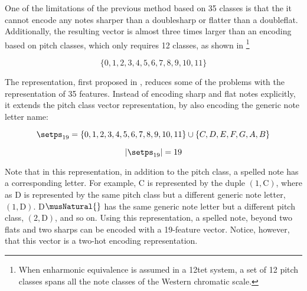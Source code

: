 
One of the limitations of the previous method based on 35
classes is that the it cannot encode any notes sharper than
a \gls{doublesharp} or flatter than a \gls{doubleflat}.
Additionally, the resulting vector is almost three times
larger than an encoding based on pitch classes, which only
requires 12 classes, as shown in
\footnote{When enharmonic equivalence
is assumed in a \gls{12tet} system, a set of 12 pitch
classes spans all the note classes of the Western chromatic
scale.}

\begin{equation}
    \label{eq:pitch_classes}
    \{0, 1, 2, 3, 4, 5, 6, 7, 8, 9, 10, 11\}
\end{equation}

The representation, first proposed in
\textcite{napoleslopez2021augmentednet}, reduces some of the
problems with the representation of 35 features. Instead of
encoding \gls{sharp} and \gls{flat} notes explicitly, it
extends the pitch class vector representation, by also
encoding the generic note letter name:

\begin{equation}
    \label{eq:pitch_spelling_19}
    \setps_{19} = \{0, 1, 2, 3, 4, 5, 6, 7, 8, 9, 10, 11\} 
    \cup \{C, D, E, F, G, A, B\}
\end{equation}


\begin{equation}
    \label{eq:pitch_spelling_19_magnitude}
    | \setps_{19} | = 19
\end{equation}

Note that in this representation, in addition to the pitch
class, a spelled note has a corresponding letter. For
example, C\musSharp{} is represented by the duple $(1,
\text{C})$, where as D\musFlat{} is represented by the same
pitch class but a different generic note letter, $(1,
\text{D})$. D$\musNatural{}$ has the same generic note
letter but a different pitch class, $(2, \text{D})$, and so
on. Using this representation, a spelled note, beyond two
flats and two sharps can be encoded with a 19-feature
vector. Notice, however, that this vector is a two-hot
encoding representation.
